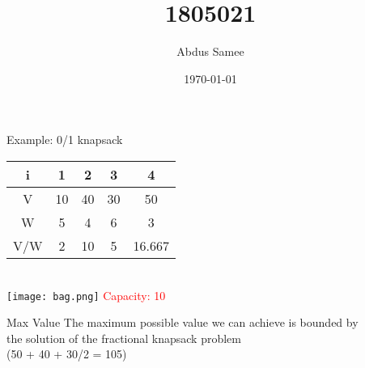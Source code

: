 \documentclass{beamer}
\title{1805021}
\author{Abdus Samee}
\date{\today}
\begin{document}
\begin{frame}{Example: 0/1 knapsack}
    \begin{table}[h]
        \centering
        \begin{tabular}{|c|c|c|c|c|}
             \hline
             i & 1 & 2 & 3 & 4\\
             \hline
             V & 10 & 40 & 30 & 50\\
             \hline
             W & 5 & 4 & 6 & 3\\
             \hline {} 
             V/W & 2 & 10 & 5 & 16.667\\
             \hline
        \end{tabular}\\
        \texttt{[image: bag.png]}
        \textcolor{red}{Capacity: 10}
    \end{table} \pause

    \begin{block}{Max Value}
        \centering
        The maximum possible value we can achieve is bounded by\\ the solution of the fractional knapsack problem\\ (50 + 40 + 30/2 = 105)
    \end{block}
\end{frame}
\end{document}
